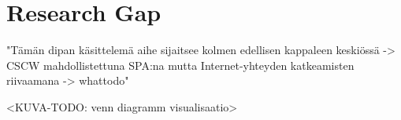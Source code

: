 \section{Research Gap}

"Tämän dipan käsittelemä aihe sijaitsee kolmen edellisen kappaleen keskiössä -> CSCW mahdollistettuna SPA:na mutta Internet-yhteyden katkeamisten riivaamana -> whattodo"

<KUVA-TODO: venn diagramm visualisaatio>







